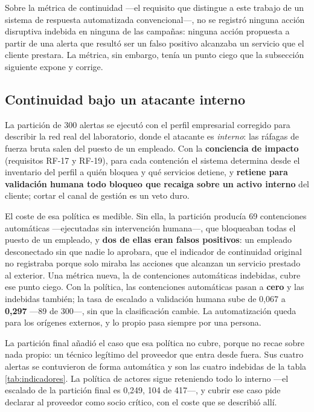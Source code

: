 Sobre la métrica de continuidad ---el requisito que distingue a este trabajo de un sistema de
respuesta automatizada convencional---, no se registró ninguna acción disruptiva indebida en ninguna
de las campañas: ninguna acción propuesta a partir de una alerta que resultó ser un falso positivo alcanzaba un servicio que
el cliente prestara. La métrica, sin embargo, tenía un punto ciego que la subsección siguiente
expone y corrige.

\subsection{Continuidad bajo un atacante interno}

La partición de 300 alertas se ejecutó con el perfil empresarial corregido para describir la red
real del laboratorio, donde el atacante es \emph{interno}: las ráfagas de fuerza bruta salen del
puesto de un empleado. Con la \textbf{conciencia de impacto} (requisitos RF-17 y RF-19), para cada
contención el sistema determina desde el inventario del perfil a quién bloquea y qué servicios
detiene, y \textbf{retiene para validación humana todo bloqueo que recaiga sobre un activo interno}
del cliente; cortar el canal de gestión es un veto duro.

El coste de esa política es medible. Sin ella, la partición producía 69 contenciones automáticas
---ejecutadas sin intervención humana---, que bloqueaban todas el puesto de un empleado, y \textbf{dos
de ellas eran falsos positivos}: un empleado desconectado sin que nadie lo aprobara, que el
indicador de continuidad original no registraba porque solo miraba las acciones que alcanzan un
servicio prestado al exterior. Una métrica nueva, la de contenciones automáticas indebidas, cubre
ese punto ciego. Con la política, las contenciones automáticas pasan a \textbf{cero} y las indebidas
también; la tasa de escalado a validación humana sube de 0,067 a \textbf{0,297} ---89 de 300---, sin
que la clasificación cambie. La automatización queda para los orígenes externos, y lo propio pasa
siempre por una persona.

La partición final añadió el caso que esa política no cubre, porque no recae sobre nada propio: un
técnico legítimo del proveedor que entra desde fuera. Sus cuatro alertas se contuvieron de forma
automática y son las cuatro indebidas de la tabla \ref{tab:indicadores}. La política de actores
sigue reteniendo todo lo interno ---el escalado de la partición final es 0,249, 104 de 417---, y
cubrir ese caso pide declarar al proveedor como socio crítico, con el coste que se describió allí.


